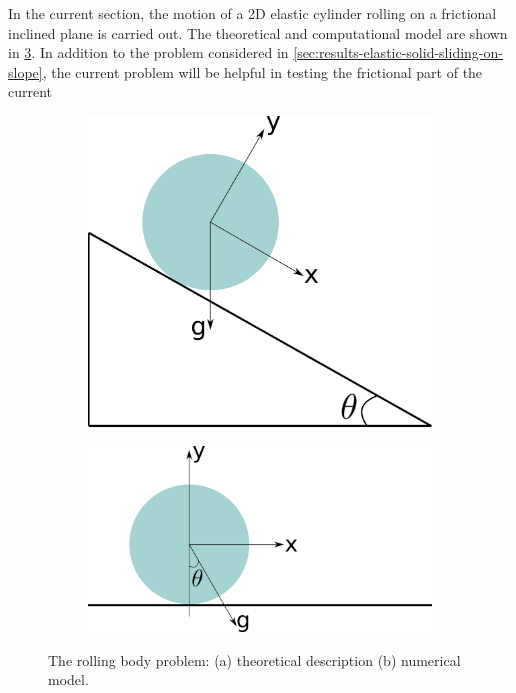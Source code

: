 In the current section, the motion of a 2D elastic cylinder rolling on a
frictional inclined plane is carried out. The theoretical and computational
model are shown in \cref{fig:circular-rolling}. In addition to the problem
considered in \cref{sec:results-elastic-solid-sliding-on-slope}, the current
problem will be helpful in testing the frictional part of the current
\begin{figure}[!htpb]
  \centering
  \begin{subfigure}{0.40\textwidth}
    \centering
    \includegraphics[width=1.0\textwidth]{images/csph/images/de_2021_cylinder_rolling_on_an_inclined_plane/schematic_1}
    \subcaption{}\label{fig:circular-rolling-theory}
  \end{subfigure}
  \begin{subfigure}{0.48\textwidth}
    \centering
    \includegraphics[width=1.0\textwidth]{images/csph/images/de_2021_cylinder_rolling_on_an_inclined_plane/schematic_2}
    \subcaption{}\label{fig:circular-rolling-computational}
  \end{subfigure}
  \caption{The rolling body problem: (a) theoretical description (b) numerical model.}
\label{fig:circular-rolling}
\end{figure}
